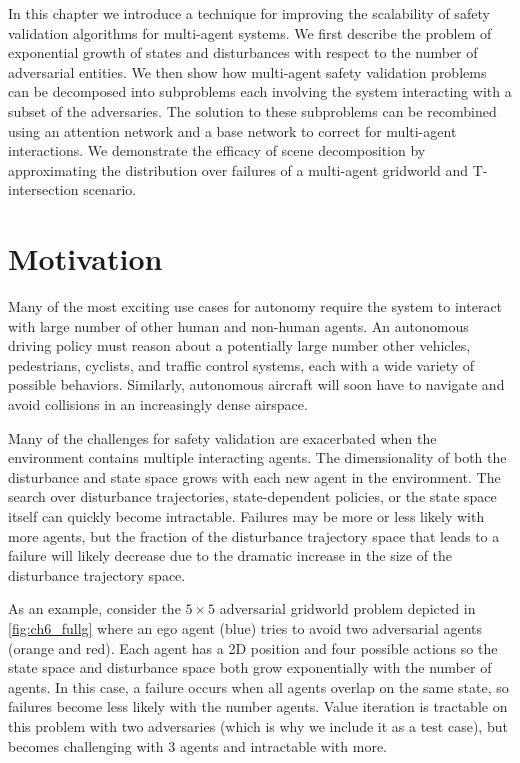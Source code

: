 In this chapter we introduce a technique for improving the scalability of safety validation algorithms for multi-agent systems. We first describe the problem of exponential growth of states and disturbances with respect to the number of adversarial entities. We then show how multi-agent safety validation problems can be decomposed into subproblems each involving the system interacting with a subset of the adversaries. The solution to these subproblems can be recombined using an attention network and a base network to correct for multi-agent interactions. We demonstrate the efficacy of scene decomposition by approximating the distribution over failures of a multi-agent gridworld and T-intersection scenario.

\section{Motivation}

Many of the most exciting use cases for autonomy require the system to interact with large number of other human and non-human agents. An autonomous driving policy must reason about a potentially large number other vehicles, pedestrians, cyclists, and traffic control systems, each with a wide variety of possible behaviors. Similarly, autonomous aircraft will soon have to navigate and avoid collisions in an increasingly dense airspace.

Many of the challenges for safety validation are exacerbated when the environment contains multiple interacting agents. The dimensionality of both the disturbance and state space grows with each new agent in the environment. The search over disturbance trajectories, state-dependent policies, or the state space itself can quickly become intractable. Failures may be more or less likely with more agents, but the fraction of the disturbance trajectory space that leads to a failure will likely decrease due to the dramatic increase in the size of the disturbance trajectory space. 

As an example, consider the $5 \times 5$ adversarial gridworld problem depicted in \cref{fig:ch6_fullg} where an ego agent (blue) tries to avoid two adversarial agents (orange and red).  Each agent has a 2D position and four possible actions so the state space and disturbance space both grow exponentially with the number of agents. In this case, a failure occurs when all agents overlap on the same state, so failures become less likely with the number agents. Value iteration is tractable on this problem with two adversaries (which is why we include it as a test case), but becomes challenging with \num{3} agents and intractable with more.

